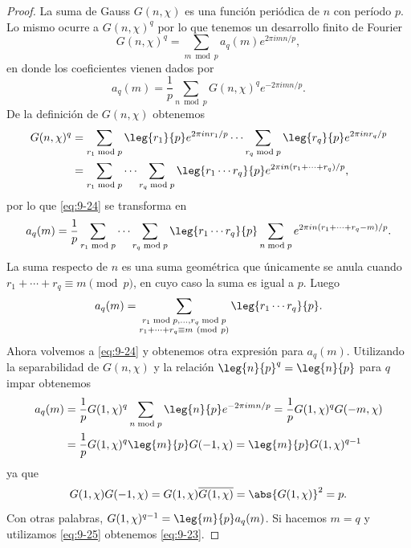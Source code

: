 \documentclass[12pt,a4paper]{book}
\begin{document}
    \begin{proof}
        La suma de Gauss $G(n,\chi)$ es una función periódica de $n$ con período $p$. Lo
        mismo ocurre a $G(n,\chi)^{q}$ por lo que tenemos un desarrollo finito de Fourier
        \begin{equation*}
            G(n,\chi)^{q}=\sum_{m\bmod p}a_{q}(m)e^{2\pi imn/p},
        \end{equation*}
        en donde los coeficientes vienen dados por
        \begin{equation}\label{eq:9-24}
            a_{q}(m)=\frac{1}{p}\sum_{n\bmod p}G(n,\chi)^{q}e^{-2\pi imn/p}.
        \end{equation}
        De la definición de $G(n,\chi)$ obtenemos
        \begin{align*}
            G(n,\chi)^{q}&=\sum_{r_{1}\bmod p}\leg{r_{1}}{p}e^{2\pi inr_{1}/p}\cdots\sum_{r_{q}\bmod p}\leg{r_{q}}{p}e^{2\pi inr_{q}/p}\\
            &=\sum_{r_{1}\bmod p}\cdots\sum_{r_{q}\bmod p}\leg{r_{1}\cdots r_{q}}{p}e^{2\pi in(r_{1}+\cdots+r_{q})/p},
        \end{align*}
        por lo que \eqref{eq:9-24} se transforma en
        \begin{equation*}
            a_{q}(m)=\frac{1}{p}\sum_{r_{1}\bmod p}\cdots\sum_{r_{q}\bmod p}\leg{r_{1}\cdots r_{q}}{p}\sum_{n\bmod p}e^{2\pi in(r_{1}+\cdots+r_{q}-m)/p}.
        \end{equation*}
        La suma respecto de $n$ es una suma geométrica que únicamente se anula cuando
        $r_{1}+\cdots+r_{q}\equiv m\pmod{p}$, en cuyo caso la suma es igual a $p$. Luego
        \begin{equation}\label{eq:9-25}
            a_{q}(m)=\sum_{\substack{r_{1}\bmod p,\dots,r_{q}\bmod p\\r_{1}+\cdots+r_{q}\equiv m\ (\mathrm{mod}\ p)}}\leg{r_{1}\cdots r_{q}}{p}.
        \end{equation}
        Ahora volvemos a \eqref{eq:9-24} y obtenemos otra expresión para $a_{q}(m)$.
        Utilizando la separabilidad de $G(n,\chi)$ y la relación $\leg{n}{p}^{q}=\leg{n}{p}$
        para $q$ impar obtenemos
        \begin{align*}
            a_{q}(m)&=\frac{1}{p}G(1,\chi)^{q}\sum_{n\bmod p}\leg{n}{p}e^{-2\pi imn/p}=\frac{1}{p}G(1,\chi)^{q}G(-m,\chi)\\
            &=\frac{1}{p}G(1,\chi)^{q}\leg{m}{p}G(-1,\chi)=\leg{m}{p}G(1,\chi)^{q-1}
        \end{align*}
        ya que
        \begin{equation*}
            G(1,\chi)G(-1,\chi)=G(1,\chi)\overline{G(1,\chi)}=\abs{G(1,\chi)}^{2}=p.
        \end{equation*}
        Con otras palabras, $G(1,\chi)^{q-1}=\leg{m}{p}a_{q}(m)$. Si hacemos $m=q$ y
        utilizamos \eqref{eq:9-25} obtenemos \eqref{eq:9-23}.
    \end{proof}
\end{document}

